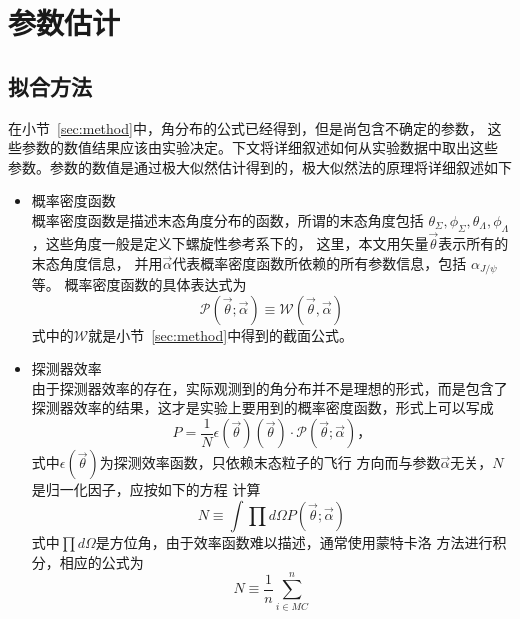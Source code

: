 \section{参数估计}%
\label{sec:determine-form-fectors}
\subsection{拟合方法}%
\label{sec:sigma-likelihood}
在小节~\ref{sec:method}中，角分布的公式已经得到，但是尚包含不确定的参数，
这些参数的数值结果应该由实验决定。下文将详细叙述如何从实验数据中取出这些
参数。参数的数值是通过极大似然估计得到的，极大似然法的原理将详细叙述如下
\begin{itemize}
    \item 概率密度函数\\
        概率密度函数是描述末态角度分布的函数，所谓的末态角度包括
        $\theta_{\Sigma}, \phi_{\Sigma}, \theta_{\Lambda},
        \phi_{\Lambda}$，这些角度一般是定义下螺旋性参考系下的，
        这里，本文用矢量$\vec{\theta}$表示所有的末态角度信息，
        并用$\vec{\alpha}$代表概率密度函数所依赖的所有参数信息，包括
        $\alpha_{J/\psi}$等。
        概率密度函数的具体表达式为
        \begin{equation}
            \mathcal{P} (\vec{\theta}; \vec{\alpha}) \equiv 
            \mathcal{W} (\vec{\theta}, \vec{\alpha})
        \end{equation}
        式中的$\mathcal{W}$就是小节~\ref{sec:method}中得到的截面公式。
    \item 探测器效率\\
        由于探测器效率的存在，实际观测到的角分布并不是理想的形式，而是包含了
        探测器效率的结果，这才是实验上要用到的概率密度函数，形式上可以写成
        \begin{equation}
            P = \frac{1}{N}  \epsilon(\vec{\theta})(\vec{\theta})
            \cdot \mathcal{P}(\vec{\theta}; \vec{\alpha})，
        \end{equation}
        式中$\epsilon(\vec{\theta})$为探测效率函数，只依赖末态粒子的飞行
        方向而与参数$\vec{\alpha}$无关，$N$是归一化因子，应按如下的方程
        计算
        \begin{equation}
            N \equiv \int \prod d\Omega P(\vec{\theta}; \vec{\alpha})
        \end{equation}
        式中$\prod{d \Omega}$是方位角，由于效率函数难以描述，通常使用蒙特卡洛
        方法进行积分，相应的公式为
        \begin{equation}
            N \equiv \frac{1}{n}  \sum_{i \in MC}^{n} 

\end{equation}
\end{itemize}
